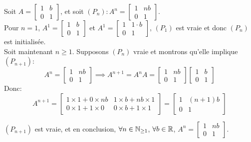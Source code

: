 \begin{exercice}
\noindent Soit $A = \begin{bmatrix}
1 & b \\ 0 & 1 \end{bmatrix}$, et soit $(P_n): A^n = \begin{bmatrix} 1 & nb \\ 0 & 1 \end{bmatrix}$. \\
Pour $n=1$, $A^1 = \begin{bmatrix} 1 & b \\ 0 & 1 \end{bmatrix}$ et $A^1 = \begin{bmatrix} 1 & 1\cdot b \\ 0 & 1 \end{bmatrix}$, $(P_1)$ est vraie et donc $(P_n)$ est initialisée. \\

\noindent Soit maintenant $n\geq1$. Supposons $(P_n)$ vraie et montrons qu'elle implique $(P_{n+1})$:
$$A^n = \begin{bmatrix}
1 & nb \\ 0 & 1 \end{bmatrix} \implies A^{n+1} = A^n A = \begin{bmatrix}
1 & nb \\ 0 & 1 \end{bmatrix}  \begin{bmatrix}
1 & b \\ 0 & 1 \end{bmatrix}$$
Donc:
$$A^{n+1} = \begin{bmatrix}
1\times 1 + 0\times nb & 1\times b + nb \times 1 \\ 0\times 1 + 1\times 0 & 0 \times b + 1 \times 1 \end{bmatrix} = \begin{bmatrix} 1 & (n+1)b \\ 0 & 1 \end{bmatrix}$$

\noindent $(P_{n+1})$ est vraie, et en conclusion, $\forall n \in \mathbb{N}_{\geq 1}$, $\forall b \in \mathbb{R}$, $A^n = \begin{bmatrix}
1 & nb \\ 0 & 1 \end{bmatrix}$. \\
\end{exercice}

